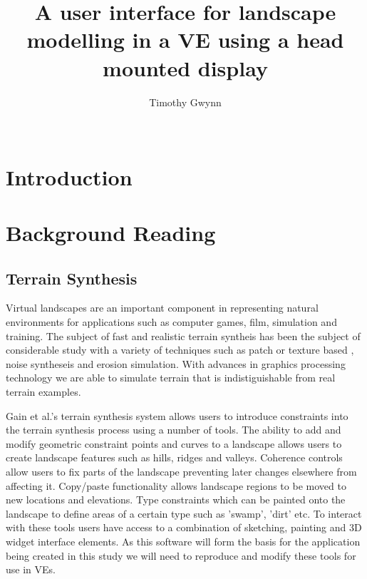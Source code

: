 \documentclass{sig-alternate-05-2015}
\begin{document}
\title{A user interface for landscape modelling in a VE using a head mounted display}

\author{
\alignauthor
Timothy Gwynn\\
       \\
}
\maketitle
\begin{CCSXML}

\end{CCSXML}



\printccsdesc
{}
\begin{abstract}
	
\end{abstract}
\section{Introduction}
\section{Background Reading}
\subsection{Terrain Synthesis} 
Virtual landscapes are an important component in representing natural environments for applications such as computer games, film, simulation and training\cite{Gain2015}. The subject of fast and realistic terrain syntheis has been the subject of considerable study with a variety of techniques such as patch or texture based \cite{Cruz2015, Tasse2012}, noise syntheseis\cite{Musgrave1989} and erosion simulation\cite{Anh2007}. With advances in graphics processing technology we are able to simulate terrain that is indistiguishable from real terrain examples\cite{Gain2015}. 

 Gain et al.'s terrain synthesis system allows users to introduce constraints into the terrain synthesis process using a number of tools\cite{Gain2015}. The ability to add and modify geometric constraint points and curves to a landscape allows users to create landscape features such as hills, ridges and valleys.  Coherence controls allow users to fix parts of the landscape preventing later changes elsewhere from affecting it. Copy/paste functionality allows landscape regions to be moved to new locations and elevations. Type constraints which can be painted onto the landscape to define areas of a certain type such as 'swamp', 'dirt' etc. To interact with these tools users have access to a combination of sketching, painting and 3D widget interface elements. As this software will form the basis for the application being created in this study we will need to reproduce and modify these tools for use in VEs.
\end{document}
